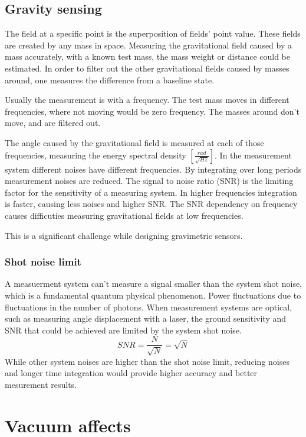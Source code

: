 \documentclass[\main/master.tex]{subfiles}
\begin{document}
\subsection{Gravity sensing}
The field at a specific point is the superposition of fields' point value. These fields are created by any mass in space. Measuring the gravitational field caused by a mass accurately, with a known test mass, the mass weight or distance could be estimated. In order to filter out the other gravitational fields caused by masses around, one measures the difference from a baseline state.
\par\noindent
Usually the measurement is with a frequency. The test mass moves in different frequencies, where not moving would be zero frequency. The masses around don't move, and are filtered out.
\par\noindent
The angle caused by the gravitational field is measured at each of those frequencies, measuring the energy spectral density $[\frac{rad}{\sqrt{Hz}}]$.
In the measurement system different noises have different frequencies. By integrating over long periods measurement noises are reduced. The signal to noise ratio (SNR) is the limiting factor for the sensitivity of a measuring system. In higher frequencies integration is faster, causing less noises and higher SNR.
The SNR dependency on frequency causes difficuties measuring gravitational fields at low frequencies.
\par\noindent
This is a significant challenge while designing gravimetric sensors.

\subsubsection{Shot noise limit}
A measuerment system can't measure a signal smaller than the system shot noise, which is a fundamental quantum physical phenomenon. Power fluctuations due to fluctuations in the number of photons. When measurement systems are optical, such as measuring angle displacement with a laser, the ground sensitivity and SNR that could be achieved are limited by the system shot noise.   
\begin{equation}
SNR = \frac{N}{\sqrt{N}} = \sqrt{N}    \label{eqn:shot_noise}
\end{equation}
While other system noises are higher than the shot noise limit, reducing noises and longer time integration would provide higher accuracy and better mesurement results. 


\section{Vacuum affects}
\end{document}
